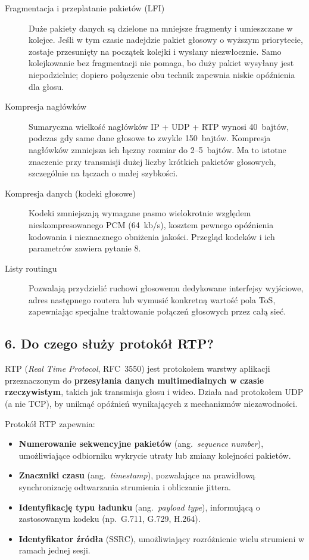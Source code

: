 \documentclass[12pt,a4paper]{article}
\begin{document}
\begin{description}
  \item[Fragmentacja i przeplatanie pakietów (LFI)]
        Duże pakiety danych są dzielone na mniejsze fragmenty i umieszczane
        w kolejce. Jeśli w tym czasie nadejdzie pakiet głosowy o wyższym
        priorytecie, zostaje przesunięty na początek kolejki i wysłany
        niezwłocznie. Samo kolejkowanie bez fragmentacji nie pomaga, bo duży
        pakiet wysyłany jest niepodzielnie; dopiero połączenie obu technik
        zapewnia niskie opóźnienia dla głosu.

  \item[Kompresja nagłówków]
        Sumaryczna wielkość nagłówków IP + UDP + RTP wynosi 40~bajtów, podczas
        gdy same dane głosowe to zwykle 150~bajtów. Kompresja nagłówków
        zmniejsza ich łączny rozmiar do 2--5~bajtów. Ma to istotne znaczenie
        przy transmisji dużej liczby krótkich pakietów głosowych, szczególnie
        na łączach o małej szybkości.

  \item[Kompresja danych (kodeki głosowe)]
        Kodeki zmniejszają wymagane pasmo wielokrotnie względem nieskompresowanego
        PCM (64~kb/s), kosztem pewnego opóźnienia kodowania i nieznacznego
        obniżenia jakości. Przegląd kodeków i ich parametrów zawiera pytanie 8.

  \item[Listy routingu]
        Pozwalają przydzielić ruchowi głosowemu dedykowane interfejsy wyjściowe,
        adres następnego routera lub wymusić konkretną wartość pola ToS,
        zapewniając specjalne traktowanie połączeń głosowych przez całą sieć.
\end{description}

\subsection*{6. Do czego służy protokół RTP?}

RTP (\emph{Real Time Protocol}, RFC~3550) jest protokołem warstwy aplikacji
przeznaczonym do \textbf{przesyłania danych multimedialnych w czasie rzeczywistym},
takich jak transmisja głosu i wideo. Działa nad protokołem UDP (a nie TCP),
by uniknąć opóźnień wynikających z mechanizmów niezawodności.

Protokół RTP zapewnia:
\begin{itemize}
  \item \textbf{Numerowanie sekwencyjne pakietów} (ang.\ \emph{sequence number}),
        umożliwiające odbiorniku wykrycie utraty lub zmiany kolejności pakietów.
  \item \textbf{Znaczniki czasu} (ang.\ \emph{timestamp}), pozwalające na
        prawidłową synchronizację odtwarzania strumienia i obliczanie jittera.
  \item \textbf{Identyfikację typu ładunku} (ang.\ \emph{payload type}),
        informującą o zastosowanym kodeku (np.\ G.711, G.729, H.264).
  \item \textbf{Identyfikator źródła} (SSRC), umożliwiający rozróżnienie wielu
        strumieni w ramach jednej sesji.
\end{itemize}
\end{document}
